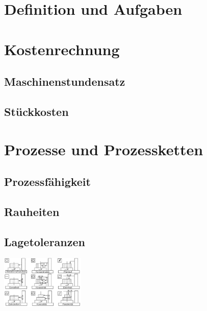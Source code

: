 \documentclass[12pt]{cheatsheet}
\author{Gian Maria Ernst - ernstg\\  \vspace*{0.2em} \normalsize{Based on the work by F. Spengler} \vspace*{-0.2em}}\doctitle{Fertigunstechnik}
\begin{document}
\small

\section*{Definition und Aufgaben}
    

\section*{Kostenrechnung}
    \subsection*{Maschinenstundensatz}
    
    \subsection*{Stückkosten}
    
    \vfill \null \columnbreak

\section*{Prozesse und Prozessketten}
    
    
    \subsection*{Prozessfähigkeit}
    
    \subsection*{Rauheiten}
    
    \subsection*{Lagetoleranzen}
    \begin{center}\includegraphics[width = 40mm]{src/images/lagetoleranzen.png}\end{center}
\end{document}
